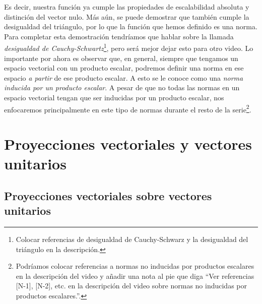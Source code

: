 \documentclass[12pt,dvipsnames]{article}
\numberwithin{equation}{section}
\begin{document}
\noindent Es decir, nuestra función ya cumple las propiedades de escalabilidad absoluta y distinción del vector nulo. Más aún, se puede demostrar que también cumple la desigualdad del triángulo, por lo que la función que hemos definido es una norma. Para completar esta demostración tendríamos que hablar sobre la llamada \emph{desigualdad de Cauchy-Schwartz}\footnote{Colocar referencias de desigualdad de Cauchy-Schwarz y la desigualdad del triángulo en la descripción.}, pero será mejor dejar esto para otro video. Lo importante por ahora es observar que, en general, siempre que tengamos un espacio vectorial con un producto escalar, podremos definir una norma en ese espacio \emph{a partir} de ese producto escalar. A esto se le conoce como una \emph{norma inducida por un producto escalar}. A pesar de que no todas las normas en un espacio vectorial tengan que ser inducidas por un producto escalar, nos enfocaremos principalmente en este tipo de normas durante el resto de la serie\footnote{Podríamos colocar referencias a normas no inducidas por productos escalares en la descripción del video y añadir una nota al pie que diga ``Ver referencias [N-1], [N-2], etc. en la descripción del video sobre normas no inducidas por productos escalares.''.}.


\section{Proyecciones vectoriales y vectores unitarios}

\subsection{Proyecciones vectoriales sobre vectores unitarios}
\end{document}
